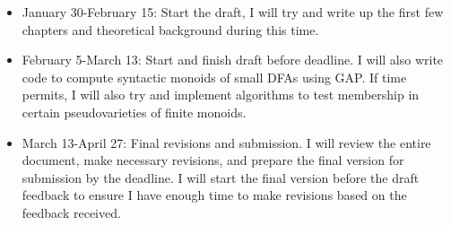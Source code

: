 \begin{itemize}
\begin{itemize}
		\textbf{Note:} January 1-30th is reading week and exam period so I will not be doing much work on the project during this time.
	\end{itemize}
	\item January 30-February 15: Start the draft, I will try and write up the first few chapters and theoretical background during this time.
		\item February 5-March 13: Start and finish draft before deadline. I will also write code to compute syntactic monoids of small DFAs using GAP. If time permits, I will also try and implement algorithms to test membership in certain pseudovarieties of finite monoids.
		\item March 13-April 27: Final revisions and submission. I will review the entire document, make necessary revisions, and prepare the final version for submission by the deadline. I will start the final version before the draft feedback to ensure I have enough time to make revisions based on the feedback received.
\end{itemize}